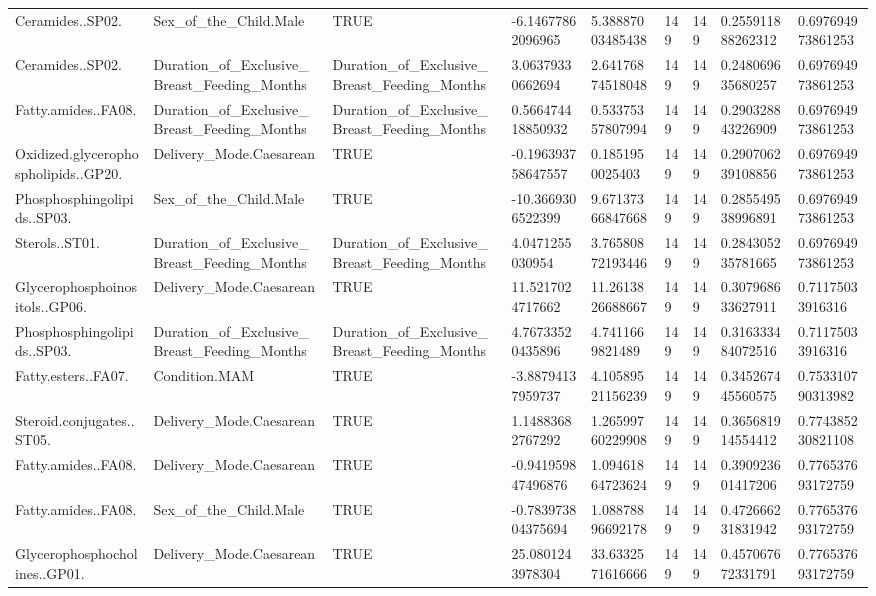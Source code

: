 \begin{longtable}{lllllllll}
Ceramides..SP02. & Sex\_of\_the\_Child.Male & TRUE & -6.14677862096965 & 5.38887003485438 & 149 & 149 & 0.255911888262312 & 0.697694973861253 \\
Ceramides..SP02. & Duration\_of\_Exclusive\_Breast\_Feeding\_Months & Duration\_of\_Exclusive\_Breast\_Feeding\_Months & 3.06379330662694 & 2.64176874518048 & 149 & 149 & 0.248069635680257 & 0.697694973861253 \\
Fatty.amides..FA08. & Duration\_of\_Exclusive\_Breast\_Feeding\_Months & Duration\_of\_Exclusive\_Breast\_Feeding\_Months & 0.566474418850932 & 0.53375357807994 & 149 & 149 & 0.290328843226909 & 0.697694973861253 \\
Oxidized.glycerophospholipids..GP20. & Delivery\_Mode.Caesarean & TRUE & -0.196393758647557 & 0.1851950025403 & 149 & 149 & 0.290706239108856 & 0.697694973861253 \\
Phosphosphingolipids..SP03. & Sex\_of\_the\_Child.Male & TRUE & -10.3669306522399 & 9.67137366847668 & 149 & 149 & 0.285549538996891 & 0.697694973861253 \\
Sterols..ST01. & Duration\_of\_Exclusive\_Breast\_Feeding\_Months & Duration\_of\_Exclusive\_Breast\_Feeding\_Months & 4.0471255030954 & 3.76580872193446 & 149 & 149 & 0.284305235781665 & 0.697694973861253 \\
Glycerophosphoinositols..GP06. & Delivery\_Mode.Caesarean & TRUE & 11.5217024717662 & 11.2613826688667 & 149 & 149 & 0.307968633627911 & 0.71175033916316 \\
Phosphosphingolipids..SP03. & Duration\_of\_Exclusive\_Breast\_Feeding\_Months & Duration\_of\_Exclusive\_Breast\_Feeding\_Months & 4.76733520435896 & 4.7411669821489 & 149 & 149 & 0.316333484072516 & 0.71175033916316 \\
Fatty.esters..FA07. & Condition.MAM & TRUE & -3.88794137959737 & 4.10589521156239 & 149 & 149 & 0.345267445560575 & 0.753310790313982 \\
Steroid.conjugates..ST05. & Delivery\_Mode.Caesarean & TRUE & 1.14883682767292 & 1.26599760229908 & 149 & 149 & 0.365681914554412 & 0.774385230821108 \\
Fatty.amides..FA08. & Delivery\_Mode.Caesarean & TRUE & -0.941959847496876 & 1.09461864723624 & 149 & 149 & 0.390923601417206 & 0.776537693172759 \\
Fatty.amides..FA08. & Sex\_of\_the\_Child.Male & TRUE & -0.783973804375694 & 1.08878896692178 & 149 & 149 & 0.472666231831942 & 0.776537693172759 \\
Glycerophosphocholines..GP01. & Delivery\_Mode.Caesarean & TRUE & 25.0801243978304 & 33.6332571616666 & 149 & 149 & 0.457067672331791 & 0.776537693172759 \\

\end{longtable}
